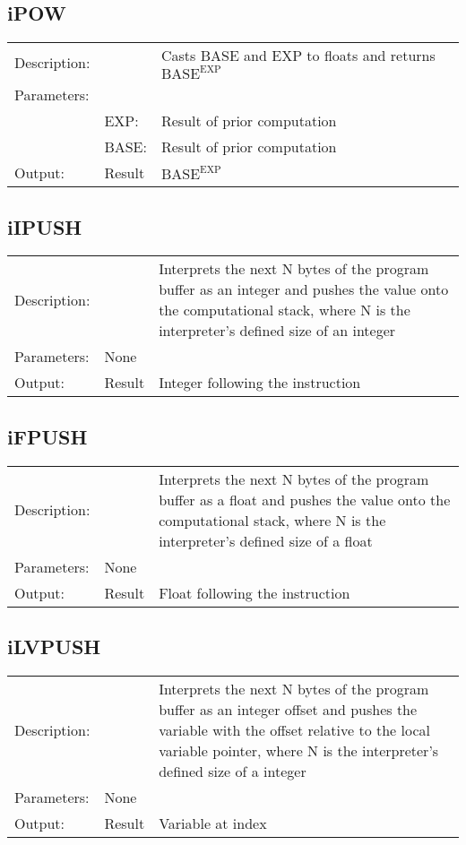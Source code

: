 \documentclass{standalone}
\begin{document}
\subsection{iPOW}
\begin{tabular}{l l p{10cm}}
Description: & ~    & Casts BASE and EXP to floats and returns $\text{BASE}^{\text{EXP}}$\\
Parameters:  & ~ & ~ \\
~			 & EXP: & Result of prior computation\\
~			 & BASE: & Result of prior computation\\
Output:      & Result & $\text{BASE}^{\text{EXP}}$\\
\end{tabular}

\subsection{iIPUSH}
\begin{tabular}{l l p{10cm}}
Description: & ~    & Interprets the next N bytes of the program buffer as an integer and pushes the value onto the computational stack, where N is the interpreter's defined size of an integer\\
Parameters:  & None & ~ \\
Output:      & Result & Integer following the instruction\\
\end{tabular}

\subsection{iFPUSH}
\begin{tabular}{l l p{10cm}}
Description: & ~    & Interprets the next N bytes of the program buffer as a float and pushes the value onto the computational stack, where N is the interpreter's defined size of a float\\
Parameters:  & None & ~ \\
Output:      & Result & Float following the instruction\\
\end{tabular}

\subsection{iLVPUSH}
\begin{tabular}{l l p{10cm}}
Description: & ~    & Interprets the next N bytes of the program buffer as an integer offset and pushes the variable with the offset relative to the local variable pointer, where N is the interpreter's defined size of a integer \\
Parameters:  & None & ~ \\
Output:      & Result & Variable at index\\
\end{tabular}
\end{document}
